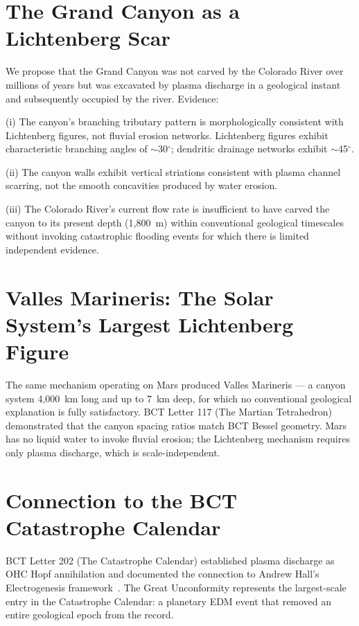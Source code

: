 \documentclass[aps,prl,twocolumn,superscriptaddress]{revtex4-2}
\begin{document}
\section{The Grand Canyon as a Lichtenberg Scar}

We propose that the Grand Canyon was not carved by the Colorado River over millions of years but was excavated by plasma discharge in a geological instant and subsequently occupied by the river. Evidence:

(i) The canyon's branching tributary pattern is morphologically consistent with Lichtenberg figures, not fluvial erosion networks. Lichtenberg figures exhibit characteristic branching angles of $\sim$30$^\circ$; dendritic drainage networks exhibit $\sim$45$^\circ$.

(ii) The canyon walls exhibit vertical striations consistent with plasma channel scarring, not the smooth concavities produced by water erosion.

(iii) The Colorado River's current flow rate is insufficient to have carved the canyon to its present depth (1,800~m) within conventional geological timescales without invoking catastrophic flooding events for which there is limited independent evidence.

\section{Valles Marineris: The Solar System's Largest Lichtenberg Figure}

The same mechanism operating on Mars produced Valles Marineris --- a canyon system 4,000~km long and up to 7~km deep, for which no conventional geological explanation is fully satisfactory. BCT Letter 117 (The Martian Tetrahedron) demonstrated that the canyon spacing ratios match BCT Bessel geometry. Mars has no liquid water to invoke fluvial erosion; the Lichtenberg mechanism requires only plasma discharge, which is scale-independent.

\section{Connection to the BCT Catastrophe Calendar}

BCT Letter 202 (The Catastrophe Calendar) established plasma discharge as OHC Hopf annihilation and documented the connection to Andrew Hall's Electrogenesis framework~\cite{Hall2020}. The Great Unconformity represents the largest-scale entry in the Catastrophe Calendar: a planetary EDM event that removed an entire geological epoch from the record.
\end{document}
